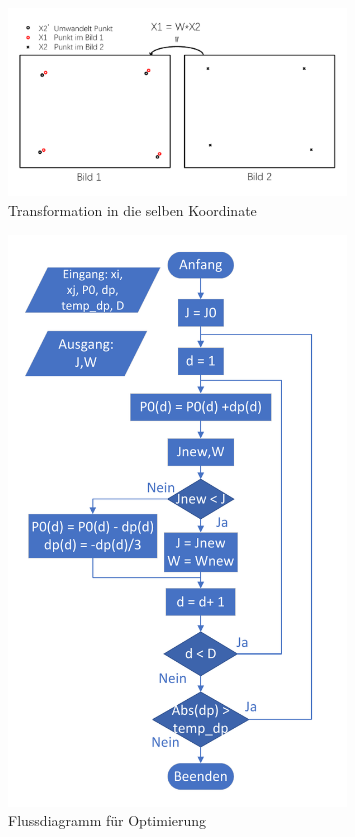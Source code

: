 \begin{figure}[H]
 \centering 
 \includegraphics[keepaspectratio,width=0.8\textwidth]{images/3_Ersteverfahren/Kamera/Transformmatrix.pdf}
 \caption{Transformation in die selben Koordinate}
 \label{fig:Transformation in eine Koordinate}
\end{figure} 

\begin{figure}[H]
 \centering 
 \includegraphics[keepaspectratio,width=0.8\textwidth]{images/3_Ersteverfahren/Kamera/flussdiagramm_for_parameter.pdf}
 \caption{Flussdiagramm für Optimierung}
 \label{fig:FlussdiagrammforOptimierung}
\end{figure} 



